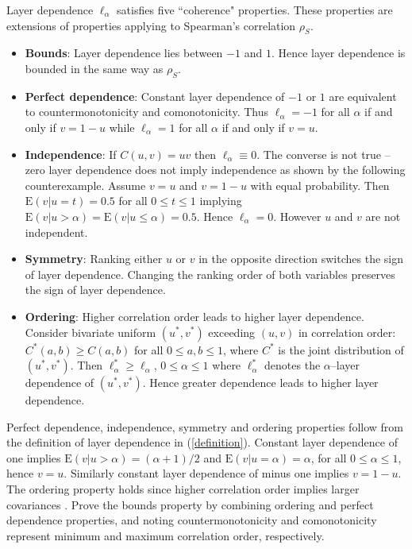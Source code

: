 \documentclass[authoryear]{elsarticle}
\newcommand{\E}{{\mathrm E}}
\newcommand{\eref}[1]{(\ref{#1})}
\begin{document}
Layer dependence $\ell_\alpha$ satisfies five ``coherence" properties. These properties are  extensions of  properties applying to Spearman's correlation $\rho_S$.
\begin{itemize}

\item \textbf{Bounds}: Layer dependence lies between $-1$ and $1$.
Hence layer dependence is bounded in the same way as  $\rho_S$.

\item \textbf{Perfect dependence}: Constant layer dependence of $-1$ or $1$ are equivalent to countermonotonicity and comonotonicity.
Thus $\ell_\alpha=-1$ for all $\alpha$ if and only if  $v=1-u$ while $\ell_\alpha=1$ for all $\alpha$ if and only if  $v=u$.

\item \textbf{Independence}: If $C(u,v)=uv$ then $\ell_\alpha\equiv 0$.   The converse is not true -- zero layer dependence does not imply independence as shown by the following counterexample. Assume $v=u$ and $v=1-u$ with equal probability. Then $\E(v|u=t)=0.5$ for all $0\leq t\leq 1$ implying $\E(v|u>\alpha)=\E(v|u\leq\alpha)=0.5$. Hence $\ell_\alpha=0$. However $u$ and $v$ are not independent.

\item \textbf{Symmetry}: Ranking either $u$ or $v$ in the opposite direction switches the sign of layer dependence. Changing the ranking order of both variables preserves the sign of layer dependence.

\item \textbf{Ordering}: Higher correlation order \citep{dhaene2009correlation} leads to higher layer dependence. Consider bivariate uniform $(u^*,v^*)$ exceeding $(u,v)$ in correlation order: $C^*(a,b)\geq C(a,b)$ for all $0\leq a,b\leq 1$, where $C^*$ is the joint distribution of $(u^*,v^*)$. Then
$
\ell^*_\alpha \geq \ell_\alpha$,   $0\leq\alpha\leq 1$
where $\ell_\alpha^*$ denotes the $\alpha$--layer dependence of $(u^*,v^*)$. Hence greater dependence leads to higher layer dependence.

\end{itemize}
Perfect dependence, independence, symmetry and ordering properties follow from the definition of layer dependence in \eref{definition}. Constant layer dependence of one implies $\E(v|u>\alpha)=(\alpha+1)/2$ and $\E(v|u=\alpha)=\alpha$, for all $0\leq\alpha\leq 1$, hence $v=u$. Similarly constant layer dependence of minus one implies $v=1-u$. The ordering property holds since higher correlation order implies larger covariances \citep{dhaene2009correlation}. Prove the bounds property by combining ordering and perfect dependence properties, and noting countermonotonicity and comonotonicity represent minimum and maximum correlation order, respectively.
\end{document}
